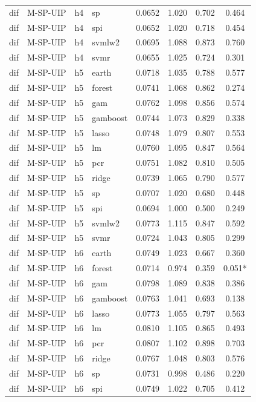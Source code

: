 \begin{ThreePartTable}
\begin{longtable}[t]{llclcccc}
dif & M-SP-UIP & h4 & sp & 0.0652 & 1.020 & 0.702 & 0.464\\
dif & M-SP-UIP & h4 & spi & 0.0652 & 1.020 & 0.718 & 0.454\\
dif & M-SP-UIP & h4 & svmlw2 & 0.0695 & 1.088 & 0.873 & 0.760\\
dif & M-SP-UIP & h4 & svmr & 0.0655 & 1.025 & 0.724 & 0.301\\
\addlinespace
dif & M-SP-UIP & h5 & earth & 0.0718 & 1.035 & 0.788 & 0.577\\
dif & M-SP-UIP & h5 & forest & 0.0741 & 1.068 & 0.862 & 0.274\\
dif & M-SP-UIP & h5 & gam & 0.0762 & 1.098 & 0.856 & 0.574\\
dif & M-SP-UIP & h5 & gamboost & 0.0744 & 1.073 & 0.829 & 0.338\\
dif & M-SP-UIP & h5 & lasso & 0.0748 & 1.079 & 0.807 & 0.553\\
dif & M-SP-UIP & h5 & lm & 0.0760 & 1.095 & 0.847 & 0.564\\
dif & M-SP-UIP & h5 & pcr & 0.0751 & 1.082 & 0.810 & 0.505\\
dif & M-SP-UIP & h5 & ridge & 0.0739 & 1.065 & 0.790 & 0.577\\
dif & M-SP-UIP & h5 & sp & 0.0707 & 1.020 & 0.680 & 0.448\\
dif & M-SP-UIP & h5 & spi & 0.0694 & 1.000 & 0.500 & 0.249\\
dif & M-SP-UIP & h5 & svmlw2 & 0.0773 & 1.115 & 0.847 & 0.592\\
dif & M-SP-UIP & h5 & svmr & 0.0724 & 1.043 & 0.805 & 0.299\\
\addlinespace
dif & M-SP-UIP & h6 & earth & 0.0749 & 1.023 & 0.667 & 0.360\\
dif & M-SP-UIP & h6 & forest & 0.0714 & 0.974 & 0.359 & 0.051*\\
dif & M-SP-UIP & h6 & gam & 0.0798 & 1.089 & 0.838 & 0.386\\
dif & M-SP-UIP & h6 & gamboost & 0.0763 & 1.041 & 0.693 & 0.138\\
dif & M-SP-UIP & h6 & lasso & 0.0773 & 1.055 & 0.797 & 0.563\\
dif & M-SP-UIP & h6 & lm & 0.0810 & 1.105 & 0.865 & 0.493\\
dif & M-SP-UIP & h6 & pcr & 0.0807 & 1.102 & 0.898 & 0.703\\
dif & M-SP-UIP & h6 & ridge & 0.0767 & 1.048 & 0.803 & 0.576\\
dif & M-SP-UIP & h6 & sp & 0.0731 & 0.998 & 0.486 & 0.220\\
dif & M-SP-UIP & h6 & spi & 0.0749 & 1.022 & 0.705 & 0.412\\

\end{longtable}
\end{ThreePartTable}
